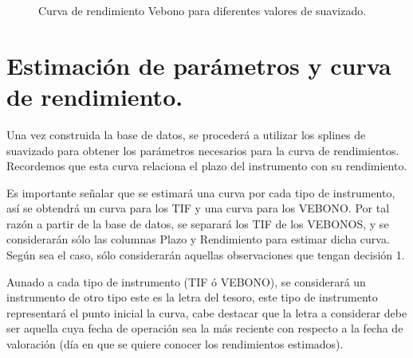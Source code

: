 \begin{figure}[h]
\caption{Curva de rendimiento Vebono para diferentes valores de suavizado.}
\label{fig9}
\end{figure}




\newpage


\section{Estimaci\'on de par\'ametros y curva de rendimiento.}

\hspace{0.4cm} Una vez construida la base de datos, se proceder\'a a utilizar los splines de suavizado para obtener los par\'ametros necesarios para la curva de rendimientos. Recordemos que esta curva relaciona el plazo del instrumento con su rendimiento.

\vspace{0.5cm}

\hspace{0.4cm} Es importante se\~nalar que se estimar\'a una curva por cada tipo de instrumento, as\'i se obtendr\'a un curva para los TIF y una curva para los VEBONO. Por tal raz\'on a partir de la base de datos, se separar\'a los TIF de los VEBONOS, y se considerar\'an s\'olo las columnas Plazo y Rendimiento para estimar dicha curva. Seg\'un sea el caso, s\'olo considerar\'an aquellas observaciones que tengan decisi\'on 1.


\hspace{0.4cm} Aunado a cada tipo de instrumento (TIF \'o VEBONO), se considerar\'a un instrumento de otro tipo este es la letra del tesoro, este tipo de instrumento representar\'a el punto inicial la curva, cabe destacar que la letra a considerar debe ser aquella cuya fecha de operaci\'on sea la m\'as reciente con respecto a la fecha de valoraci\'on (d\'ia en que se quiere conocer los rendimientos estimados).

